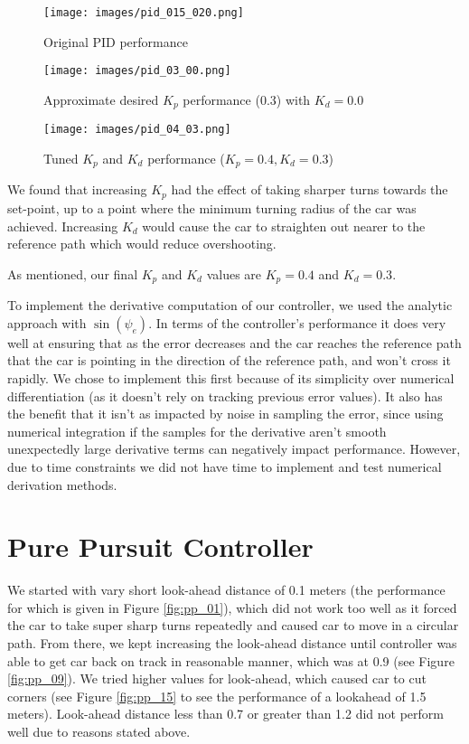 \documentclass{article}
\begin{document}
\begin{figure}[!h]
\centering
  \texttt{[image: images/pid\_015\_020.png]}
  \caption{Original PID performance}
  \label{fig:pid_orig_perf}
\end{figure}

\begin{figure}
  \texttt{[image: images/pid\_03\_00.png]}
  \caption{Approximate desired $K_p$ performance (0.3) with $K_d = 0.0$}
  \label{fig:pid_tuneKp}
\end{figure}

\begin{figure}
  \texttt{[image: images/pid\_04\_03.png]}
  \caption{Tuned $K_p$ and $K_d$ performance ($K_p = 0.4, K_d = 0.3$)}
  \label{fig:pid_tuneKpKd}
\end{figure}

We found that increasing $K_p$ had the effect of taking sharper
turns towards the set-point, up to a point where the minimum turning radius
of the car was achieved. Increasing $K_d$ would cause the car to straighten out
nearer to the reference path which would reduce overshooting.

As mentioned, our final $K_p$ and $K_d$ values are $K_p = 0.4$ and $K_d = 0.3$.

To implement the derivative computation of our controller, we used
the analytic approach with $\sin(\psi_e)$. In terms of the controller's performance
it does very well at ensuring that as the error decreases and the car
reaches the reference path that the car is pointing in the direction of the
reference path, and won't cross it rapidly. We chose to implement this
first because of its simplicity over numerical differentiation (as it doesn't
rely on tracking previous error values). It also has the benefit that it
isn't as impacted by noise in sampling the error, since using numerical
integration if the samples for the derivative aren't smooth unexpectedly large
derivative terms can negatively impact performance. However, due to time constraints
we did not have time to implement and test numerical derivation methods.

\newpage
\section{Pure Pursuit Controller}

We started with vary short look-ahead distance of 0.1 meters
(the performance for which is given in Figure \ref{fig:pp_01}),
which did not 
work too well as it forced the car to take super sharp turns repeatedly and 
caused car to move in a circular path. From there, we kept increasing the
look-ahead distance until controller was able to get car back on track in 
reasonable manner, which was at 0.9 (see Figure \ref{fig:pp_09}).
We tried higher values for look-ahead, which caused car to cut corners
(see Figure \ref{fig:pp_15} to see the performance of a lookahead of
1.5 meters).
Look-ahead distance less than 0.7 or greater than 1.2 did not perform well 
due to reasons stated above.
\end{document}
